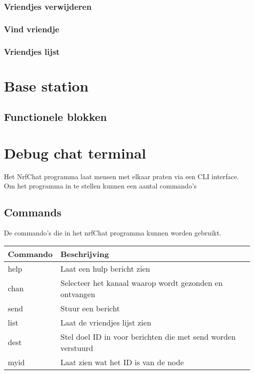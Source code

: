     \subsubsection{Vriendjes verwijderen}
    \subsubsection{Vind vriendje}
    \subsubsection{Vriendjes lijst} \label{ch:printFriends}

\section{Base station}
    \subsection{Functionele blokken}
\section{Debug chat terminal}

Het NrfChat programma laat mensen met elkaar praten via een CLI interface. Om het programma in te stellen kunnen een aantal commando's

\subsection{Commands}
De commando's die in het nrfChat programma kunnen worden gebruikt.

\begin{table}[h]
    \begin{tabular}{|l|l|} \hline
        \textbf{Commando} & \textbf{Beschrijving} \\\hline
        help & Laat een hulp bericht zien \\\hline
        chan & Selecteer het kanaal waarop wordt gezonden en ontvangen\\\hline
        send & Stuur een bericht \\\hline
        list & Laat de vriendjes lijst zien\\\hline
        dest & Stel doel ID in voor berichten die met send worden verstuurd \\\hline
        myid & Laat zien wat het ID is van de node \\\hline
    \end{tabular}
\end{table}

